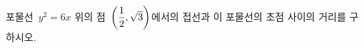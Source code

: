 포물선~$y^2=6x$ 위의 점~$\left(\dfrac{1}{2}{,}\mkern3mu\mathopen{}\sqrt{3}\right)$에서의 접선과 이 포물선의 초점 사이의 거리를 구하시오.
